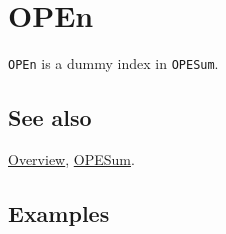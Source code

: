 \documentclass[../FeynCalcManual.tex]{subfiles}
\begin{document}
\hypertarget{open}{
\section{OPEn}\label{open}}

\texttt{OPEn} is a dummy index in \texttt{OPESum}.

\subsection{See also}

\hyperlink{toc}{Overview}, \hyperlink{opesum}{OPESum}.

\subsection{Examples}
\end{document}
